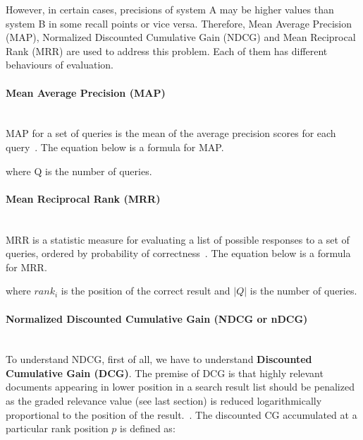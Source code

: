 However, in certain cases, precisions of system A may be higher values than system B in some recall points or vice versa. Therefore,
Mean Average Precision (MAP), Normalized Discounted Cumulative Gain (NDCG) and Mean Reciprocal Rank (MRR) are used to address this problem.
Each of them has different behaviours of evaluation.

\paragraph{Mean Average Precision (MAP)} \hspace{0pt} \\
MAP for a set of queries is the mean of the average precision scores for each query~\cite{IR}. The equation below is
a formula for MAP.
\begin{center}
\end{center}
where Q is the number of queries.

\paragraph{Mean Reciprocal Rank (MRR)} \hspace{0pt} \\
MRR is a statistic measure for evaluating a list of possible responses to a set of queries, ordered by 
probability of correctness~\cite{mrr}. The equation below is a formula for MRR.
\begin{center}
\end{center}
where $rank_i$ is the position of the correct result and $|Q|$ is the number of queries.

\paragraph{Normalized Discounted Cumulative Gain (NDCG or nDCG)} \hspace{0pt} \\
To understand NDCG, first of all, we have to understand \textbf{Discounted Cumulative Gain (DCG)}. 
The premise of DCG is that highly relevant documents appearing in lower position in a search result list should be penalized as 
the graded relevance value (see last section) is 
reduced logarithmically proportional to the position of the result.~\cite{ndcg}. The discounted CG accumulated at a particular rank position
$p$ is defined as:

